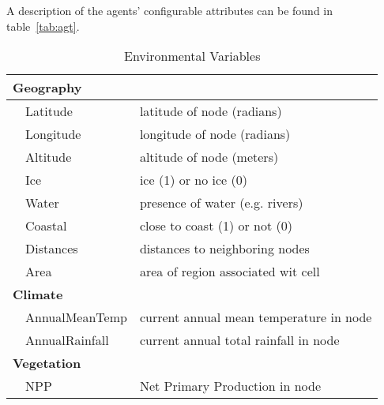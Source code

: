 \documentclass[a4paper,oneside]{article}
\begin{document}
A description of the agents' configurable attributes can be found in table~\ref{tab:agt}.


\begin{table}[ht!]
  \begin{center}
  \caption{Environmental Variables}
  \label{tab:env}
  \begin{tabular}{cl|l}
    \hline
    \multicolumn{3}{l}{\bf{Geography}}                                 \\
    \hline
    \space & Latitude    &  latitude of node  (radians)                \\
    \space & Longitude   &  longitude of node (radians)                \\ 
    \space & Altitude    &  altitude of node (meters)                  \\
    \space & Ice         &  ice (1) or no ice (0)                      \\
    \space & Water       &  presence of water (e.g. rivers)            \\  
    \space & Coastal     &  close to coast (1) or not (0)              \\ 
    \space & Distances   &  distances to neighboring nodes             \\
    \space & Area        &  area of region associated wit cell         \\
    \hline
    \multicolumn{2}{l}{\bf{Climate}}                                   \\
    \hline
    \space & AnnualMeanTemp &  current annual mean temperature in node \\
    \space & AnnualRainfall &  current annual total rainfall in node   \\
    \hline
    \multicolumn{2}{l}{\bf{Vegetation}}                                \\
    \hline
    \space & NPP            &  Net Primary Production in node          \\
    \hline

  \end{tabular}

  \end{center}
\end{table}
\end{document}
